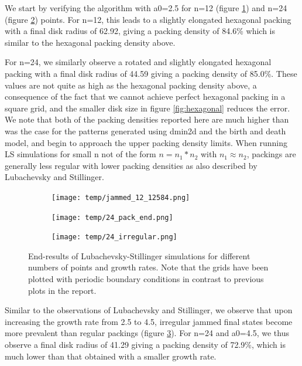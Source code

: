 \documentclass{article}
\begin{document}
We start by verifying the algorithm with a0=2.5 for n=12 (figure \ref{fig:12}) and n=24 (figure \ref{fig:24}) points. For n=12, this leads to a slightly elongated hexagonal packing with a final disk radius of 62.92, giving a packing density of 84.6\% which is similar to the hexagonal packing density above.

For n=24, we similarly observe a rotated and slightly elongated hexagonal packing with a final disk radius of 44.59 giving a packing density of 85.0\%. These values are not quite as high as the hexagonal packing density above, a consequence of the fact that we cannot achieve perfect hexagonal packing in a square grid, and the smaller disk size in figure \ref{fig:hexagonal} reduces the error. We note that both of the packing densities reported here are much higher than was the case for the patterns generated using dmin2d and the birth and death model, and begin to approach the upper packing density limits. When running LS simulations for small n not of the form $n=n_1*n_2$ with $n_1 \approx n_2$, packings are generally less regular with lower packing densities as also described by Lubachevsky and Stillinger.

\begin{figure}[h]
	\centering
	\begin{subfigure}[t]{0.30\linewidth}
		\centering
		\texttt{[image: temp/jammed\_12\_12584.png]}
		\label{fig:12}	
	\end{subfigure}
	\hspace{0.0005\linewidth}
	\begin{subfigure}[t]{0.30\linewidth}
		\centering
		\texttt{[image: temp/24\_pack\_end.png]}
		\label{fig:24}	
	\end{subfigure}
	\hspace{0.0005\linewidth}
	\begin{subfigure}[t]{0.30\linewidth}
		\centering
		\texttt{[image: temp/24\_irregular.png]}
		\label{fig:24high}	
	\end{subfigure}
\label{fig:models}
\caption{End-results of Lubachevsky-Stillinger simulations for different numbers of points and growth rates. Note that the grids have been plotted with periodic boundary conditions in contrast to previous plots in the report.}
\end{figure}

Similar to the observations of Lubachevsky and Stillinger, we observe that upon increasing the growth rate from 2.5 to 4.5, irregular jammed final states become more prevalent than regular packings (figure \ref{fig:24high}).
For n=24 and a0=4.5, we thus observe a final disk radius of 41.29 giving a packing density of 72.9\%, which is much lower than that obtained with a smaller growth rate.
\end{document}
